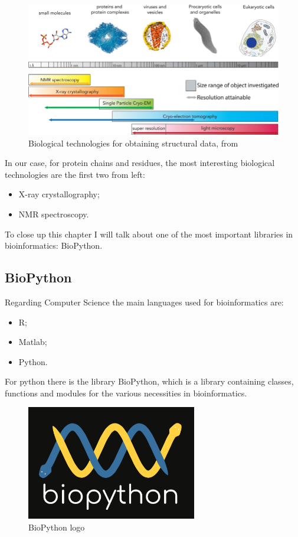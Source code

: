 \begin{figure}[h!]
    \centering
    \includegraphics[scale=0.6]{res/proteins_overview/methods_structural.png}
    \caption{Biological technologies for obtaining structural data, from \cite{biotechs}}
\end{figure}

In our case, for protein chains and residues, the most interesting biological technologies are the first two from left:
\begin{itemize}
    \item X-ray crystallography;
    \item NMR spectroscopy.
\end{itemize}

To close up this chapter I will talk about one of the most important libraries in bioinformatics: BioPython.

\pagebreak

\subsection{BioPython}
Regarding Computer Science the main languages used for bioinformatics are:
\begin{itemize}
    \item R;
    \item Matlab;
    \item Python.
\end{itemize}
For python there is the library BioPython, which is a library containing classes, functions and modules for the various necessities in bioinformatics.

\begin{figure}[h!]
    \centering
    \includegraphics{res/proteins_overview/biopython.png}
    \caption{BioPython logo}
\end{figure}

